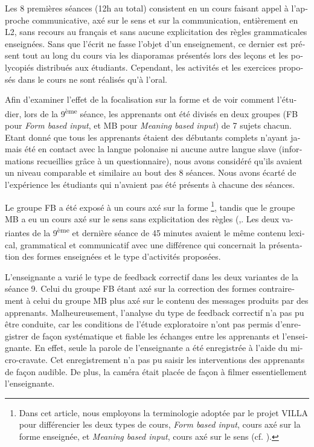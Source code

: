 \documentclass[output=paper]{langscibook}
\begin{document}
\begin{otherlanguage}{french}
Les 8 premières séances (12h au total) consistent en un cours faisant appel à l’approche communicative, axé sur le sens et sur la communication, entièrement en L2, sans recours au français et sans aucune explicitation des règles grammaticales enseignées. Sans que l’écrit ne fasse l’objet d’un enseignement, ce dernier est présent tout au long du cours via les diaporamas présentés lors des leçons et les polycopiés distribués aux étudiants. Cependant, les activités et les exercices proposés dans le cours ne sont réalisés qu’à l’oral.

Afin d’examiner l’effet de la focalisation sur la forme et de voir comment l’étudier, lors de la 9\textsuperscript{ème} séance, les apprenants ont été divisés en deux groupes (FB pour \textit{Form based input}, et MB pour \textit{Meaning based} \textit{input}) de 7 sujets chacun. Etant donné que tous les apprenants étaient des débutants complets n’ayant jamais été en contact avec la langue polonaise ni aucune autre langue slave (informations recueillies grâce à un questionnaire), nous avons considéré qu’ils avaient un niveau comparable et similaire au bout des 8 séances. Nous avons écarté de l’expérience les étudiants qui n’avaient pas été présents à chacune des séances.

Le groupe FB a été exposé à un cours axé sur la forme \footnote{ Dans cet article, nous employons la terminologie adoptée par le projet VILLA pour différencier les deux types de cours, \textit{Form based input}, cours axé sur la forme enseignée, et \textit{Meaning based input}, cours axé sur le sens (cf. \citealt{DimrothEtAl2013}).}, tandis que le groupe MB a eu un cours axé sur le sens sans explicitation des règles (,. Les deux variantes de la 9\textsuperscript{ème} et dernière séance de 45 minutes avaient le même contenu lexical, grammatical et communicatif avec une différence qui concernait la présentation des formes enseignées et le type d’activités proposées. 

L’enseignante a varié le type de feedback correctif dans les deux variantes de la séance 9. Celui du groupe FB étant axé sur la correction des formes contrairement à celui du groupe MB plus axé sur le contenu des messages produits par des apprenants. Malheureusement,  l’analyse du type de feedback correctif n’a pas pu être conduite, car les conditions de l’étude exploratoire n’ont pas permis d’enregistrer de façon systématique et fiable les échanges entre les apprenants et l’enseignante. En effet, seule la parole de l’enseignante a été enregistrée à l’aide du micro-cravate. Cet enregistrement n’a pas pu saisir les interventions des apprenants de façon audible. De plus, la caméra était placée de façon à filmer essentiellement l’enseignante.



\end{otherlanguage}
\end{document}
